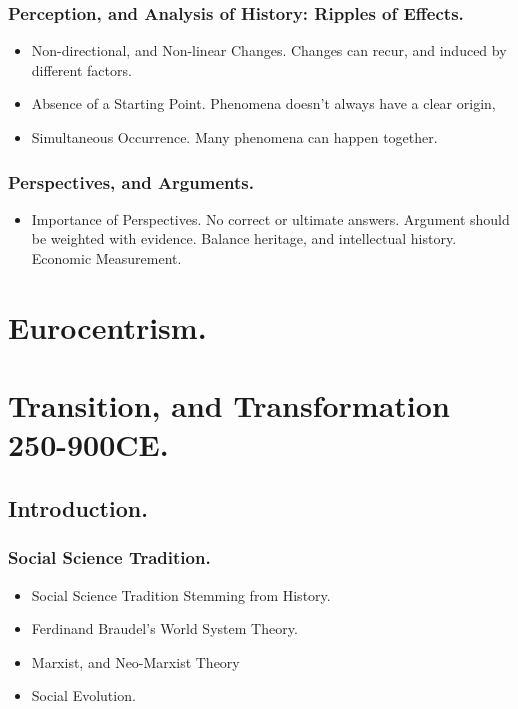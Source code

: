 \documentclass[11pt]{book}
\begin{document}
				\subsubsection{Perception, and Analysis of History: Ripples of Effects.}
					\begin{itemize}
						\item Non-directional, and Non-linear Changes.
							\subitem Changes can recur, and induced by different factors.
						\item Absence of a Starting Point.
							\subitem Phenomena doesn't always have a clear origin,
						\item Simultaneous Occurrence.
							\subitem Many phenomena can happen together.
					\end{itemize}

				\subsubsection{Perspectives, and Arguments.}
					\begin{itemize}
						\item Importance of Perspectives.
							\subitem No correct or ultimate answers.
							\subitem Argument should be weighted with evidence.
							\subitem Balance heritage, and intellectual history.
							\subitem Economic Measurement.
					\end{itemize}


		\section{Eurocentrism.}
		\section{Transition, and Transformation 250-900CE.}
			\subsection{Introduction.}
				\subsubsection{Social Science Tradition.}
					\begin{itemize}
						\item Social Science Tradition Stemming from History.
						\item Ferdinand Braudel's World System Theory.
						\item Marxist, and Neo-Marxist Theory
						\item Social Evolution.
					\end{itemize}
\end{document}

